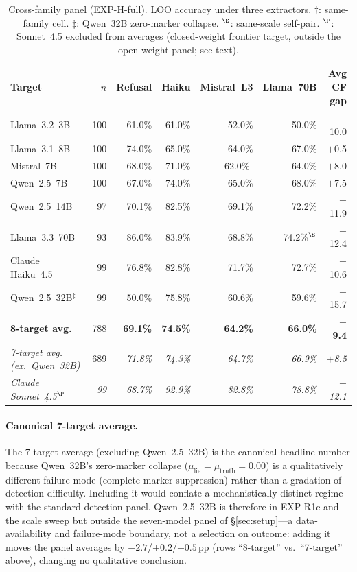 \begin{table}[h]
\centering
\caption{Cross-family panel (EXP-H-full). LOO accuracy under three extractors. $\dagger$: same-family cell. $\ddagger$: Qwen~32B zero-marker collapse. $^\S$: same-scale self-pair. $^\P$: Sonnet~4.5 excluded from averages (closed-weight frontier target, outside the open-weight panel; see text).}
\label{tab:cross_family_panel}
\begin{small}
\begin{tabular}{lrrrrrr}
\toprule
\textbf{Target} & \textbf{$n$} & \textbf{Refusal} & \textbf{Haiku} & \textbf{Mistral~L3} & \textbf{Llama~70B} & \textbf{Avg CF gap} \\
\midrule
Llama~3.2~3B     & 100 & 61.0\% & 61.0\% & 52.0\% & 50.0\% & $+$10.0 \\
Llama~3.1~8B     & 100 & 74.0\% & 65.0\% & 64.0\% & 67.0\% & $+$0.5 \\
Mistral~7B       & 100 & 68.0\% & 71.0\% & 62.0\%$^\dagger$ & 64.0\% & $+$8.0 \\
Qwen~2.5~7B      & 100 & 67.0\% & 74.0\% & 65.0\% & 68.0\% & $+$7.5 \\
Qwen~2.5~14B     &  97 & 70.1\% & 82.5\% & 69.1\% & 72.2\% & $+$11.9 \\
Llama~3.3~70B    &  93 & 86.0\% & 83.9\% & 68.8\% & 74.2\%$^\S$ & $+$12.4 \\
Claude Haiku~4.5 &  99 & 76.8\% & 82.8\% & 71.7\% & 72.7\% & $+$10.6 \\
Qwen~2.5~32B$^\ddagger$ &  99 & 50.0\% & 75.8\% & 60.6\% & 59.6\% & $+$15.7 \\
\midrule
\textbf{8-target avg.} & 788 & \textbf{69.1\%} & \textbf{74.5\%} & \textbf{64.2\%} & \textbf{66.0\%} & \textbf{$+$9.4} \\
\textit{7-target avg. (ex.\ Qwen~32B)} & 689 & \textit{71.8\%} & \textit{74.3\%} & \textit{64.7\%} & \textit{66.9\%} & \textit{$+$8.5} \\
\midrule
\textit{Claude Sonnet~4.5$^\P$} & \textit{99} & \textit{68.7\%} & \textit{92.9\%} & \textit{82.8\%} & \textit{78.8\%} & \textit{$+$12.1} \\
\bottomrule
\end{tabular}
\end{small}
\end{table}

\paragraph{Canonical 7-target average.} The 7-target average (excluding Qwen~2.5~32B) is the canonical headline number because Qwen~32B's zero-marker collapse ($\mu_\mathrm{lie}\!=\!\mu_\mathrm{truth}\!=\!0.00$) is a qualitatively different failure mode (complete marker suppression) rather than a gradation of detection difficulty. Including it would conflate a mechanistically distinct regime with the standard detection panel. Qwen~2.5~32B is therefore in EXP-R1c and the scale sweep but outside the seven-model panel of §\ref{sec:setup}---a data-availability and failure-mode boundary, not a selection on outcome: adding it moves the panel averages by $-2.7$/$+0.2$/$-0.5$\,pp (rows ``8-target'' vs.\ ``7-target'' above), changing no qualitative conclusion.

